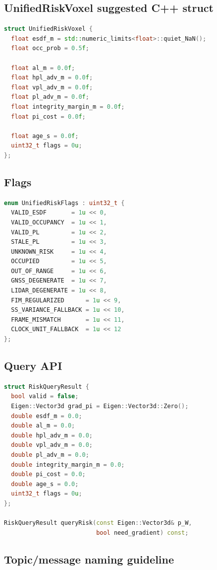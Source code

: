\documentclass[11pt,a4paper]{article}
\begin{document}
\subsection{UnifiedRiskVoxel suggested C++ struct}

\begin{lstlisting}[language=C++]
struct UnifiedRiskVoxel {
  float esdf_m = std::numeric_limits<float>::quiet_NaN();
  float occ_prob = 0.5f;

  float al_m = 0.0f;
  float hpl_adv_m = 0.0f;
  float vpl_adv_m = 0.0f;
  float pl_adv_m = 0.0f;
  float integrity_margin_m = 0.0f;
  float pi_cost = 0.0f;

  float age_s = 0.0f;
  uint32_t flags = 0u;
};
\end{lstlisting}

\subsection{Flags}

\begin{lstlisting}[language=C++]
enum UnifiedRiskFlags : uint32_t {
  VALID_ESDF       = 1u << 0,
  VALID_OCCUPANCY  = 1u << 1,
  VALID_PL         = 1u << 2,
  STALE_PL         = 1u << 3,
  UNKNOWN_RISK     = 1u << 4,
  OCCUPIED         = 1u << 5,
  OUT_OF_RANGE     = 1u << 6,
  GNSS_DEGENERATE  = 1u << 7,
  LIDAR_DEGENERATE = 1u << 8,
  FIM_REGULARIZED      = 1u << 9,
  SS_VARIANCE_FALLBACK = 1u << 10,
  FRAME_MISMATCH       = 1u << 11,
  CLOCK_UNIT_FALLBACK  = 1u << 12
};
\end{lstlisting}

\subsection{Query API}

\begin{lstlisting}[language=C++]
struct RiskQueryResult {
  bool valid = false;
  Eigen::Vector3d grad_pi = Eigen::Vector3d::Zero();
  double esdf_m = 0.0;
  double al_m = 0.0;
  double hpl_adv_m = 0.0;
  double vpl_adv_m = 0.0;
  double pl_adv_m = 0.0;
  double integrity_margin_m = 0.0;
  double pi_cost = 0.0;
  double age_s = 0.0;
  uint32_t flags = 0u;
};

RiskQueryResult queryRisk(const Eigen::Vector3d& p_W,
                          bool need_gradient) const;
\end{lstlisting}

\subsection{Topic/message naming guideline}
\end{document}
